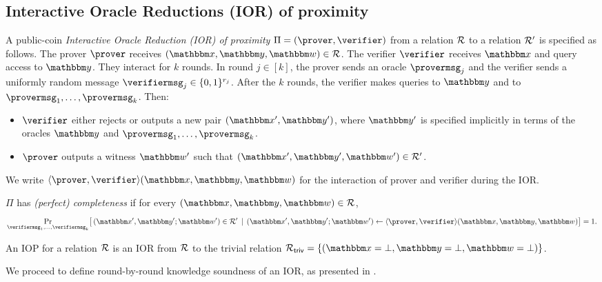 \documentclass[11pt,letterpaper,usenames,dvipsnames]{article}
\begin{document}
\subsection{Interactive Oracle Reductions (IOR) of proximity}\label{s:IORs}

A public-coin \emph{Interactive Oracle Reduction (IOR) of proximity} $\Pi=(\prover,\verifier)$ from a relation $\mathcal{R}$ to a relation $\mathcal{R}'$ is specified as follows. The prover $\prover$ receives $(\inp, \oracle,\wit)\in \Relation$. The verifier $\verifier$ receives $\inp$ and query access to $\oracle$. They interact for $k$ rounds. In round $j\in[k]$, the prover sends an oracle $\provermsg_j$ and the verifier sends a uniformly random message $\verifiermsg_j\in\{0,1\}^{r_j}$. After the $k$ rounds, the verifier makes  queries to $\oracle$ and to $\provermsg_1,\ldots,\provermsg_k$. Then:
\begin{itemize}[nosep]
  \item $\verifier$ either rejects or outputs a new  pair $(\inp', \oracle')$, where $\oracle'$ is specified implicitly in terms of the oracles $\oracle$ and $\provermsg_1,\ldots,\provermsg_k$.
  \item $\prover$ outputs a witness $\wit'$ such that $(\inp', \oracle', \wit')\in \Relation'$.
\end{itemize}
We write $ \langle \prover, \verifier\rangle(\inp,\oracle,\wit)$ for the interaction of prover and verifier during the IOR.

\begin{definition}[Completeness]
\label{def:ior-completeness}
$\Pi$ has \emph{(perfect) completeness}  if for every $(\inp, \oracle,\wit)\in\Relation$,
\[
  \Pr_{\verifiermsg_1,\dots,\verifiermsg_k}\bigl[\,(\inp',\oracle';\wit')\in \Relation'\, \mid \, (\inp',\oracle';\wit') \gets \langle \prover, \verifier\rangle(\inp,\oracle,\wit)\bigr]=1.
\]
\end{definition}

\begin{remark}
    An IOP for a relation $\mathcal{R}$ is an IOR from $\mathcal{R}$ to the trivial relation $\Relation_{\mathsf{triv}}=\{(\inp=\bot,\oracle=\bot, \wit=\bot)\}$.
\end{remark}

We proceed to define round-by-round knowledge soundness of an IOR, as presented in \cite{TCC:BCFW25}.
\end{document}
